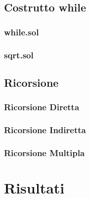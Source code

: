     \subsection{Costrutto while}
    
        \subsubsection{while.sol}

        \subsubsection{sqrt.sol}

    \subsection{Ricorsione}

        \subsubsection{Ricorsione Diretta}

        \subsubsection{Ricorsione Indiretta}
        
        \subsubsection{Ricorsione Multipla}
    
\section{Risultati}

